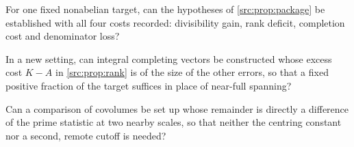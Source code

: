 \begin{question}\label{src:q:package}
For one fixed nonabelian target, can the hypotheses of \cref{src:prop:package} be established
with all four costs recorded: divisibility gain, rank deficit, completion cost and denominator
loss?
\end{question}

\begin{question}\label{src:q:completion}
In a new setting, can integral completing vectors be constructed whose excess cost $K-A$ in
\cref{src:prop:rank} is of the size of the other errors, so that a fixed positive fraction of
the target suffices in place of near-full spanning?
\end{question}

\begin{question}\label{src:q:constantfree}
Can a comparison of covolumes be set up whose remainder is directly a difference of the prime
statistic at two nearby scales, so that neither the centring constant nor a second, remote
cutoff is needed?
\end{question}

\endgroup
